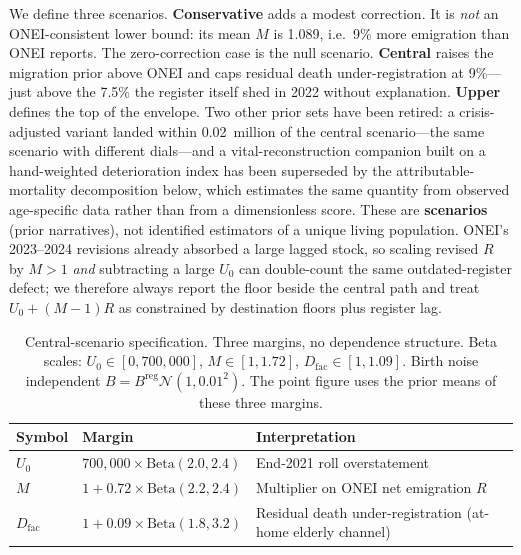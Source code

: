 \documentclass[11pt,a4paper]{article}
\begin{document}
We define three scenarios.
\textbf{Conservative} adds a modest correction. It is \emph{not} an ONEI-consistent lower bound: its mean $M$ is 1.089, i.e.\ 9\% more emigration than ONEI reports. The zero-correction case is the null scenario.
\textbf{Central} raises the migration prior above ONEI and caps residual death under-registration at 9\%---just above the 7.5\% the register itself shed in 2022 without explanation.
\textbf{Upper} defines the top of the envelope.
Two other prior sets have been retired: a crisis-adjusted variant landed within 0.02~million of the central scenario---the same scenario with different dials---and a vital-reconstruction companion built on a hand-weighted deterioration index has been superseded by the attributable-mortality decomposition below, which estimates the same quantity from observed age-specific data rather than from a dimensionless score.
These are \textbf{scenarios} (prior narratives), not identified estimators of a unique living population.
ONEI's 2023--2024 revisions already absorbed a large lagged stock, so scaling revised $R$ by $M>1$ \emph{and} subtracting a large $U_0$ can double-count the same outdated-register defect; we therefore always report the floor beside the central path and treat $U_0+(M-1)R$ as constrained by destination floors plus register lag.

\begin{table}[ht]
\centering
\caption{Central-scenario specification. Three margins, no dependence structure.
Beta scales: $U_0\in[0,700{,}000]$, $M\in[1,1.72]$, $D_{\mathrm{fac}}\in[1,1.09]$.
Birth noise independent $B=B^{\mathrm{reg}}\mathcal{N}(1,0.01^2)$.
The point figure uses the prior means of these three margins.}
\label{tab:priors}
\begin{tabular}{llp{6.2cm}}
\toprule
Symbol & Margin & Interpretation \\
\midrule
$U_0$ & $700{,}000\times\mathrm{Beta}(2.0,2.4)$ & End-2021 roll overstatement \\
$M$ & $1+0.72\times\mathrm{Beta}(2.2,2.4)$ & Multiplier on ONEI net emigration $R$ \\
$D_{\mathrm{fac}}$ & $1+0.09\times\mathrm{Beta}(1.8,3.2)$ & Residual death under-registration (at-home elderly channel) \\
\bottomrule
\end{tabular}
\end{table}
\end{document}
